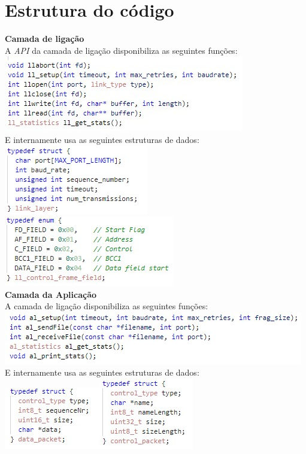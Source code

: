 \documentclass[11pt]{article}
\begin{document}
\section*{Estrutura do código}
\textbf{Camada de ligação}\\
A \emph{API} da camada de ligação disponibiliza as seguintes funções:\\
\includegraphics[scale=1]{LLAPI.jpg}\\
E internamente usa as seguintes estruturas de dados:\\
\includegraphics[scale=1]{LLSTRUCT.jpg}\includegraphics[scale=1]{LLCFF.jpg}\\
\textbf{Camada da Aplicação}\\
A camada de ligação disponibiliza as seguintes funções:\\
\includegraphics[scale=1]{ALFUN.jpg}\\
E internamente usa as seguintes estruturas de dados:\\
\includegraphics[scale=1]{ALDATA.jpg}\includegraphics[scale=1]{ALCONTROL.jpg}\\
\end{document}
